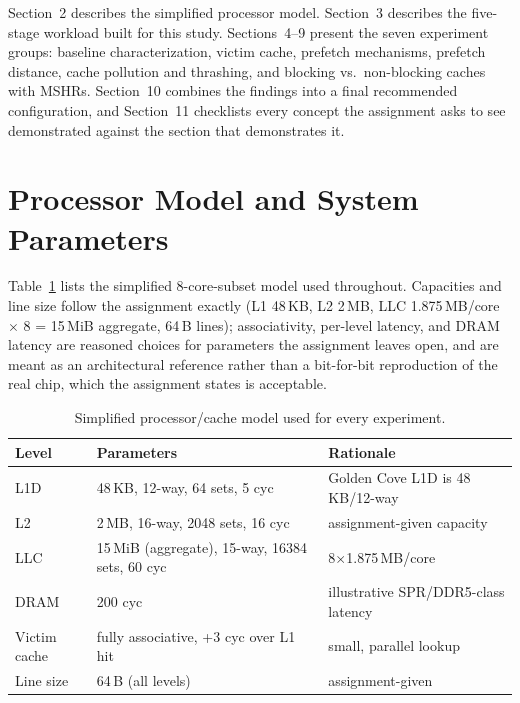 \documentclass[11pt]{article}
\begin{document}
Section~2 describes the simplified processor model. Section~3 describes the
five-stage workload built for this study. Sections~4--9 present the seven
experiment groups: baseline characterization, victim cache, prefetch
mechanisms, prefetch distance, cache pollution and thrashing, and blocking
vs.\ non-blocking caches with MSHRs. Section~10 combines the findings into a
final recommended configuration, and Section~11 checklists every concept the
assignment asks to see demonstrated against the section that demonstrates it.

\section{Processor Model and System Parameters}

Table~\ref{tab:sysparams} lists the simplified 8-core-subset model used
throughout. Capacities and line size follow the assignment exactly (L1
48\,KB, L2 2\,MB, LLC 1.875\,MB/core $\times$ 8 = 15\,MiB aggregate, 64\,B
lines); associativity, per-level latency, and DRAM latency are reasoned
choices for parameters the assignment leaves open, and are meant as an
architectural reference rather than a bit-for-bit reproduction of the real
chip, which the assignment states is acceptable.

\begin{table}[H]\centering
\begin{tabular}{lll}\toprule
Level & Parameters & Rationale \\ \midrule
L1D & 48\,KB, 12-way, 64 sets, 5 cyc & Golden Cove L1D is 48\,KB/12-way \\
L2  & 2\,MB, 16-way, 2048 sets, 16 cyc & assignment-given capacity \\
LLC & 15\,MiB (aggregate), 15-way, 16384 sets, 60 cyc & 8$\times$1.875\,MB/core \\
DRAM & 200 cyc & illustrative SPR/DDR5-class latency \\
Victim cache & fully associative, +3 cyc over L1 hit & small, parallel lookup \\
Line size & 64\,B (all levels) & assignment-given \\ \bottomrule
\end{tabular}
\caption{Simplified processor/cache model used for every experiment.}
\label{tab:sysparams}
\end{table}
\end{document}
